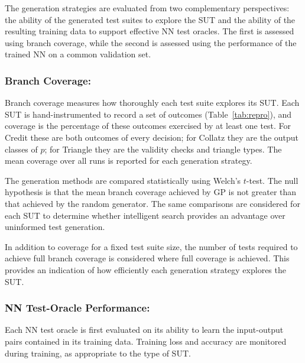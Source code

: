 \documentclass[runningheads]{llncs}
\begin{document}

The generation strategies are evaluated from two complementary perspectives: the ability of the generated test suites to explore the SUT and the ability of the resulting training data to support effective NN test oracles. The first is assessed using branch coverage, while the second is assessed using the performance of the trained NN on a common validation set.

\subsubsection{Branch Coverage:}

Branch coverage measures how thoroughly each test suite explores its SUT. Each SUT is hand-instrumented to record a set of outcomes (Table~\ref{tab:repro}), and coverage is the percentage of these outcomes exercised by at least one test. For Credit these are both outcomes of every decision; for Collatz they are the output classes of $p$; for Triangle they are the validity checks and triangle types. The mean coverage over all runs is reported for each generation strategy.

The generation methods are compared statistically using Welch's $t$-test. The null hypothesis is that the mean branch coverage achieved by GP is not greater than that achieved by the random generator. The same comparisons are considered for each SUT to determine whether intelligent search provides an advantage over uninformed test generation.

In addition to coverage for a fixed test suite size, the number of tests required to achieve full branch coverage is considered where full coverage is achieved. This provides an indication of how efficiently each generation strategy explores the SUT. 

\subsubsection{NN Test-Oracle Performance:}
Each NN test oracle is first evaluated on its ability to learn the input-output pairs contained in its training data. Training loss and accuracy are monitored during training, as appropriate to the type of SUT.
\end{document}
